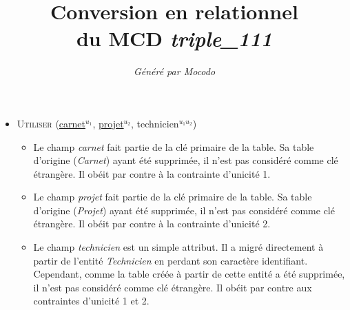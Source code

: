\documentclass[a4paper]{article}
\title{Conversion en relationnel\\du MCD \emph{triple_111}}
\author{\emph{Généré par Mocodo}}
\newcommand{\relat}[1]{\textsc{#1}}
\newcommand{\attr}[1]{#1}
\newcommand{\prim}[1]{\uline{#1}}
\begin{document}
\maketitle

\begin{itemize}
  \item \relat{Utiliser} (\prim{carnet}$^{u_1}$, \prim{projet}$^{u_2}$, \attr{technicien}$^{u_1 u_2}$)
  \begin{itemize}
    \item Le champ \emph{carnet} fait partie de la clé primaire de la table. Sa table d'origine (\emph{Carnet}) ayant été supprimée, il n'est pas considéré comme clé étrangère. Il obéit par contre à la contrainte d'unicité 1.
    \item Le champ \emph{projet} fait partie de la clé primaire de la table. Sa table d'origine (\emph{Projet}) ayant été supprimée, il n'est pas considéré comme clé étrangère. Il obéit par contre à la contrainte d'unicité 2.
    \item Le champ \emph{technicien} est un simple attribut. Il a migré directement à partir de l'entité \emph{Technicien} en perdant son caractère identifiant. Cependant, comme la table créée à partir de cette entité a été supprimée, il n'est pas considéré comme clé étrangère. Il obéit par contre aux contraintes d'unicité 1 et 2.
  \end{itemize}

\end{itemize}
\end{document}
